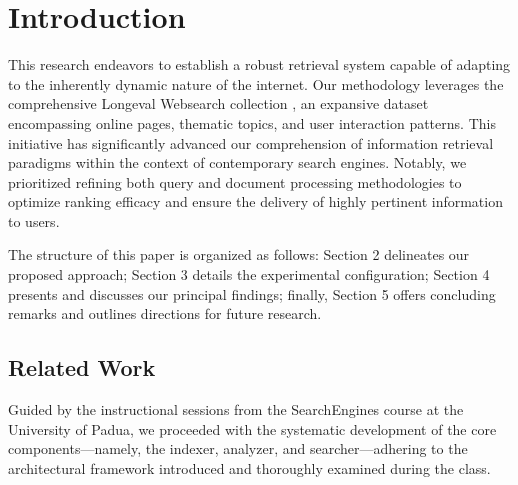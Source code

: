 \section{Introduction}
\label{sec:introduction}
This research endeavors to establish a robust retrieval system capable of adapting to the inherently dynamic nature of the internet. Our methodology leverages the comprehensive Longeval Websearch collection \cite{longeval2025}, an expansive dataset encompassing online pages, thematic topics, and user interaction patterns. This initiative has significantly advanced our comprehension of information retrieval paradigms within the context of contemporary search engines. Notably, we prioritized refining both query and document processing methodologies to optimize ranking efficacy and ensure the delivery of highly pertinent information to users.

The structure of this paper is organized as follows: Section 2 delineates our proposed approach; Section 3 details the experimental configuration; Section 4 presents and discusses our principal findings; finally, Section 5 offers concluding remarks and outlines directions for future research.

\subsection{Related Work}
Guided by the instructional sessions from the SearchEngines course at the University of Padua, we proceeded with the systematic development of the core components—namely, the indexer, analyzer, and searcher—adhering to the architectural framework introduced and thoroughly examined during the class. 

